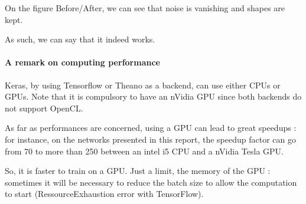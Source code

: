 \documentclass[]{article}
\begin{document}
On the figure Before/After, we can see that noise is vanishing and shapes are kept. 

As such, we can say that it indeed works.



\paragraph{A remark on computing performance} Keras, by using Tensorflow or Theano as a backend, can use either CPUs or GPUs. Note that it is compulsory to have an nVidia GPU since both backends do not support OpenCL.

As far as performances are concerned, using a GPU can lead to great speedups : for instance, on the networks presented in this report, the speedup factor can go from 70 to more than 250 between an intel i5 CPU and a nVidia Tesla GPU.

So, it is faster to train on a GPU. Just a limit, the memory of the GPU : sometimes it will be necessary to reduce the batch size to allow the computation to start (RessourceExhaustion error with TensorFlow).
\end{document}

